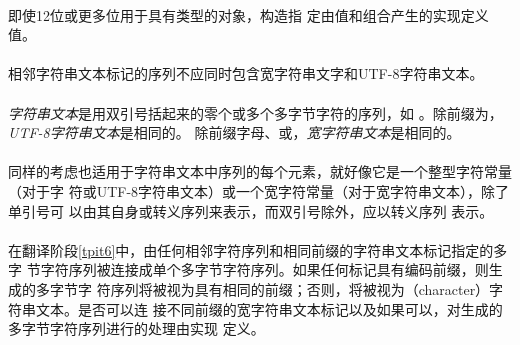 \paragraph{}
\ex 即使12位或更多位用于具有类型的对象，构造指
定由值和\tm{\sq 4\sq}组合产生的实现定义值。


\syntax
\paragraph{}

\constraint
\paragraph{}
相邻字符串文本标记的序列不应同时包含宽字符串文字和UTF-8字符串文本。

\desc
\paragraph{}
\textit{字符串文本}是用双引号括起来的零个或多个多字节字符的序列，如
。除前缀为，\textit{UTF-8字符串文本}是相同的。
除前缀字母、或，\textit{宽字符串文本}是相同的。

\paragraph{}
同样的考虑也适用于字符串文本中序列的每个元素，就好像它是一个整型字符常量（对于字
符或UTF-8字符串文本）或一个宽字符常量（对于宽字符串文本），除了单引号\tm{\sq}可
以由其自身或转义序列\tm{\bs\sq}来表示，而双引号\tm{\dq}除外，应以转义序列
\tm{\bs\dq}表示。

\semantic
\paragraph{}
在翻译阶段\ref{tpit6}中，由任何相邻字符序列和相同前缀的字符串文本标记指定的多字
节字符序列被连接成单个多字节字符序列。如果任何标记具有编码前缀，则生成的多字节字
符序列将被视为具有相同的前缀；否则，将被视为（character）字符串文本。是否可以连
接不同前缀的宽字符串文本标记以及如果可以，对生成的多字节字符序列进行的处理由实现
定义。

